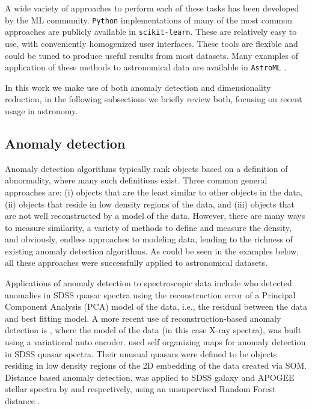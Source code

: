 \documentclass[fleqn,usenatbib]{mnras}
\newcommand{\sklearn}{\texttt{scikit-learn}}
\begin{document}
A wide variety of approaches to perform each of these tasks has been developed by the ML community. \texttt{Python} implementations of many of the most common approaches are publicly available in \sklearn. These are relatively easy to use, with conveniently homogenized user interfaces. These tools  are  flexible and could be tuned to produce useful results from most datasets. Many examples of application of these methods to astronomical data are available in \texttt{AstroML} \citep{vanderplas12}.


In this work we make use of both anomaly detection and dimensionality reduction, in the following subsections we briefly review both,   focusing on recent usage in astronomy.


\subsection{Anomaly detection}
Anomaly detection algorithms typically rank objects based on a definition of abnormality, where many such definitions exist. Three common general approaches are: (i) objects that are the least similar to other objects in the data, (ii) objects that reside in low density regions of the data, and (iii) objects that are not well reconstructed by a model of the data. However, there are many ways to measure similarity, a variety of methods to define and measure the density, and obviously, endless approaches to modeling data, lending to the richness of existing anomaly detection algorithms. As could be seen in the examples below, all these approaches were successfully applied to astronomical datasets.


Applications of anomaly detection to spectroscopic data include \citet{bronson10} who detected anomalies in SDSS quasar spectra using the reconstruction error of a Principal Component Analysis (PCA) model of the data, i.e., the residual between the data and best fitting model. A more recent use of reconstruction-based anomaly detection is \citet{ichinohe19}, where the model of the data (in this case X-ray spectra), was built using a variational auto encoder. \citet{meusinger12} used self organizing maps \citep[SOM, ][]{kohonen82} for anomaly detection in SDSS quasar spectra. Their unusual quasars were defined to be objects residing in low density regions of the 2D embedding of the data created via SOM.  Distance based anomaly detection, was applied to SDSS galaxy and APOGEE stellar spectra by \citet{baron17a} and \citet{reis18} respectively, using an unsupervised Random Forest distance \citep{shi06}. 
\end{document}
